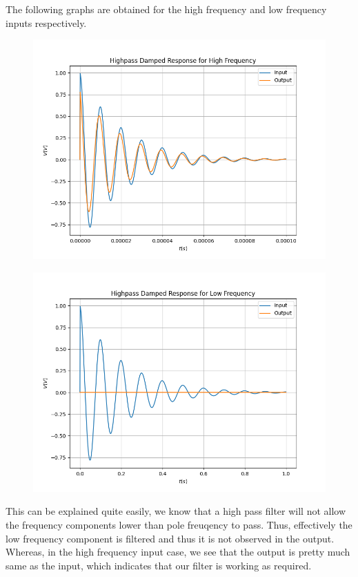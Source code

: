 \documentclass[12pt, a4paper]{article}
\begin{document}
The following graphs are obtained for the high frequency and low frequency inputs respectively.

\begin{figure}[H]
    \centering
    \includegraphics[scale=0.6]{4a.png}
\end{figure}

\begin{figure}[H]
    \centering
    \includegraphics[scale=0.6]{4b.png}
\end{figure}

This can be explained quite easily, we know that a high pass filter will not allow the frequency components lower than pole freuqency to pass. Thus, effectively the low frequency component is filtered and thus it is not observed in the output.\\
Whereas, in the high frequency input case, we see that the output is pretty much same as the input, which indicates that our filter is working as required.
\end{document}
